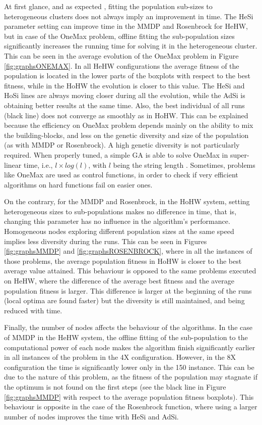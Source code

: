 \documentclass[final,1p,times]{elsarticle}
\begin{document}
At first glance, and as expected \cite{Wolpert97NFL}, fitting the
population sub-sizes to heterogeneous clusters does not always imply an
improvement in time. The HeSi parameter setting can improve time in
the MMDP and Rosenbrock for HeHW, but in case of the OneMax problem,
offline fitting  the sub-population sizes significantly increases  the running time for solving it in the heterogeneous cluster. This can be seen in the average evolution of the OneMax problem in Figure \ref{fig:graphsONEMAX}. In all HeHW configurations the average fitness of the population is located in the lower parts of the boxplots with respect to the best fitness, while in the HoHW the evolution is closer to this value. The HeSi and HoSi lines are always moving closer during all the evolution, while the AdSi is obtaining better results at the same time. Also, the best individual of all runs (black line) does not converge as smoothly as in HoHW.
This can be explained because the efficiency on OneMax problem depends mainly on the ability to mix
the building-blocks, and less on the genetic diversity and size of the
population (as with MMDP or Rosenbrock). A high genetic diversity is not particularly
required. When properly tuned, a simple GA is able to solve OneMax in super-linear time, i.e., $l \times log(l)$, with $l$ being the string length \cite{Verma09MapReduce}. Sometimes, problems like OneMax are used
as control functions, in order to check if very efficient algorithms
on hard functions fail on easier ones. 

On the contrary, for the MMDP and Rosenbrock, in the HoHW system,
setting heterogeneous sizes to sub-populations makes no difference in
time, that is, changing this parameter has no influence in the
algorithm's performance. Homogeneous nodes exploring different population sizes at the same speed implies less diversity during the runs. This can be seen in Figures \ref{fig:graphsMMDP} and \ref{fig:graphsROSENBROCK}, where in all the instances of those problems, the average population fitness in HoHW is closer to the best average value attained. This behaviour is opposed to the same problems executed on HeHW, where the difference of the average best fitness and the average population fitness is larger. This difference is  larger at the beginning of the runs (local optima are found faster) but the diversity is still maintained, and being reduced with time.



Finally, the number of nodes affects the behaviour of the
algorithms. In the case of MMDP in the HeHW system, the offline
fitting of the sub-population to the computational  power of each node
makes the algorithm finish significantly earlier in all instances of
the problem in the 4X configuration. However, in the 8X configuration
the time is significantly lower only in the 150 instance. This can be
due to the nature of this problem, as the fitness of the population may stagnate if the optimum is not found on the first steps (see the black line in Figure \ref{fig:graphsMMDP} with respect to the average population fitness boxplots). This behaviour is opposite in the case of the Rosenbrock function, where using a larger number of nodes improves the time with HeSi and AdSi. %
\end{document}

